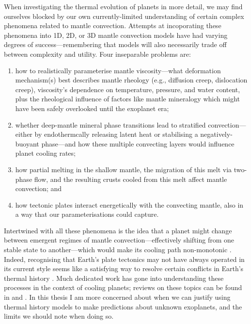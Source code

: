 When investigating the thermal evolution of planets in more detail, we may find ourselves blocked by our own currently-limited understanding of certain complex phenomena related to mantle convection. Attempts at incoporating these phenomena into 1D, 2D, or 3D mantle convection models have had varying degrees of success---remembering that models will also necessarily trade off between complexity and utility. Four inseparable problems are: 
\begin{enumerate}[label=(\roman*),font=\itshape]

\item how to realistically parameterise mantle viscosity---what deformation mechanism(s) best describes mantle rheology (e.g., diffusion creep, dislocation creep), viscosity's dependence on temperature, pressure, and water content, plus the rheological influence of factors like mantle mineralogy which might have been safely overlooked until the exoplanet era;

\item whether deep-mantle mineral phase transitions lead to stratified convection---either by endothermcally releasing latent heat or stabilising a negatively-buoyant phase---and how these multiple convecting layers would influence planet cooling rates;

\item how partial melting in the shallow mantle, the migration of this melt via two-phase flow, and the resulting crusts cooled from this melt affect mantle convection; and

\item how tectonic plates interact energetically with the convecting mantle, also in a way that our parameterisations could capture.

\end{enumerate}
Intertwined with all these phenomena is the idea that a planet might change between emergent regimes of mantle convection---effectively shifting from one stable state to another---which would make its cooling path non-monotonic \citep{sleep_evolution_2000, lenardic_notion_2012, weller_effects_2015, lenardic_solar_2016, lenardic_diversity_2018, weller_evolution_2018, weller_physics_2020, oneill_planetary_2020, seales_deep_2020}. Indeed, recognising that Earth's plate tectonics may not have always operated in its current style seems like a satisfying way to resolve certain conflicts in Earth's thermal history \citep[e.g.,][]{korenaga_urey_2008, korenaga_crustal_2018, hoink_earth_2013}. Much dedicated work has gone into understanding these processes in the context of cooling planets; reviews on these topics can be found in \citet{korenaga_urey_2008} and \citet{lenardic_internal_2022}. 
In this thesis I am more concerned about when we can justify using thermal history models to make predictions about unknown exoplanets, and the limits we should note when doing so.


